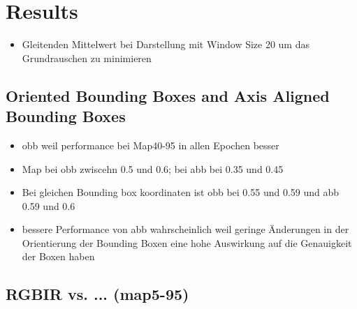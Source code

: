 \chapter{Results}
\label{ch:results}

\begin{itemize}
    \item Gleitenden Mittelwert bei Darstellung mit Window Size 20 um das Grundrauschen zu minimieren
\end{itemize}
\section{Oriented Bounding Boxes and Axis Aligned Bounding Boxes}
\begin{itemize}
    \item obb weil performance bei Map40-95 in allen Epochen besser
    \item Map bei obb zwiscehn 0.5 und 0.6; bei abb bei 0.35 und 0.45
    \item Bei gleichen Bounding box koordinaten ist obb bei 0.55 und 0.59 und abb 0.59 und 0.6
    \item bessere Performance von abb wahrscheinlich weil geringe Änderungen in der Orientierung der Bounding Boxen eine hohe Auswirkung auf die Genauigkeit der Boxen haben
\end{itemize}

\section{RGBIR vs. ... (map5-95)}

